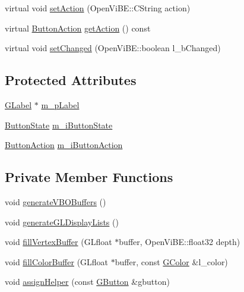 \begin{DoxyCompactItemize}
\item 
virtual void \hyperlink{classOpenViBEApplications_1_1GButton_a138cf2168d28a762fa3583d300148e5d}{setAction} (OpenViBE::CString action)
\item 
virtual \hyperlink{namespaceOpenViBEApplications_ad87631a613368054b4f5c133add72cb7}{ButtonAction} \hyperlink{classOpenViBEApplications_1_1GButton_a8faf954d313d08995cdddfe351ce7ec6}{getAction} () const 
\item 
virtual void \hyperlink{classOpenViBEApplications_1_1GButton_a38e8bfe08accb554989f1c5a5ac309fe}{setChanged} (OpenViBE::boolean l\_\-bChanged)
\end{DoxyCompactItemize}
\subsection*{Protected Attributes}
\begin{DoxyCompactItemize}
\item 
\hyperlink{classOpenViBEApplications_1_1GLabel}{GLabel} $\ast$ \hyperlink{classOpenViBEApplications_1_1GButton_a17b1282304974afc646f1d716b1f6d26}{m\_\-pLabel}
\item 
\hyperlink{namespaceOpenViBEApplications_a4b71ded51609d9643a2256d0479f0bd4}{ButtonState} \hyperlink{classOpenViBEApplications_1_1GButton_a1e013e7c20a5034f5e30cfa923673df3}{m\_\-iButtonState}
\item 
\hyperlink{namespaceOpenViBEApplications_ad87631a613368054b4f5c133add72cb7}{ButtonAction} \hyperlink{classOpenViBEApplications_1_1GButton_a62885570e148eb79955f575a2058bfb6}{m\_\-iButtonAction}
\end{DoxyCompactItemize}
\subsection*{Private Member Functions}
\begin{DoxyCompactItemize}
\item 
void \hyperlink{classOpenViBEApplications_1_1GButton_aa8fe41bb06213badf1c75dfc0e09c417}{generateVBOBuffers} ()
\item 
void \hyperlink{classOpenViBEApplications_1_1GButton_a7bf64a3dcec4e5f75b1eb9701d06388b}{generateGLDisplayLists} ()
\item 
void \hyperlink{classOpenViBEApplications_1_1GButton_abde1fd8c4edbd59da0b63e02a3c83c45}{fillVertexBuffer} (GLfloat $\ast$buffer, OpenViBE::float32 depth)
\item 
void \hyperlink{classOpenViBEApplications_1_1GButton_ae10ff931ecdde0b05a80f20c5a6eb8af}{fillColorBuffer} (GLfloat $\ast$buffer, const \hyperlink{structOpenViBEApplications_1_1GColor}{GColor} \&l\_\-color)
\item 
void \hyperlink{classOpenViBEApplications_1_1GButton_a78e51e7836788fc6e8f5c39735abf3da}{assignHelper} (const \hyperlink{classOpenViBEApplications_1_1GButton}{GButton} \&gbutton)
\end{DoxyCompactItemize}
